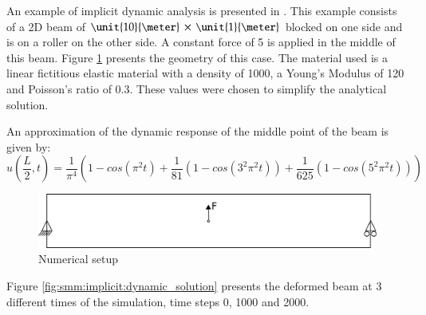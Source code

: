 

An    example    of    implicit     dynamic    analysis    is    presented    in
.  This example  consists of a 2D beam
of $\unit{10}{\meter}\,\times\,\unit{1}{\meter}$ blocked on one side and is on a
roller on the other side.  A constant force of \unit{5}{\kilo\newton} is applied
in the middle of  this beam.  Figure \ref{fig:smm:implicit:dynamic} presents the
geometry of this case. The material used is a linear fictitious elastic material
with  a density  of  \unit{1000}{\kilogrampercubicmetre}, a  Young's Modulus  of
\unit{120}{\mega\pascal} and Poisson's ratio  of $0.3$. These values were chosen
to simplify the analytical solution.

An approximation  of the  dynamic response of  the middle  point of the  beam is
given by:
\begin{equation}\label{eqn:smm:implicit}
  u\left(\frac{L}{2}, t\right) = \frac{1}{\pi^4} \left(1 - cos\left(\pi^2 t\right) +
    \frac{1}{81}\left(1 - cos\left(3^2 \pi^2 t\right)\right) +
    \frac{1}{625}\left(1 - cos\left(5^2 \pi^2 t\right)\right)\right)
\end{equation}

\begin{figure}[!htb]
  \centering
  \includegraphics[scale=.6]{figures/implicit_dynamic}
  \caption{Numerical setup}
  \label{fig:smm:implicit:dynamic}
\end{figure}

Figure \ref{fig:smm:implicit:dynamic_solution}  presents the deformed  beam at 3
different times of the simulation, time steps 0, 1000 and 2000.

